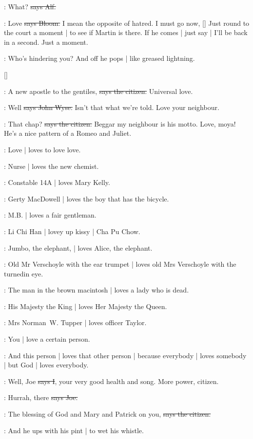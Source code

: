 \bergan:
What?
\sout{says Alf.}

\Bloom:
Love
\sout{says Bloom.}
I mean the opposite of hatred.
I must go now,
[]
Just round to the court a moment |
to see if Martin is there.
If he comes |
just say |
I'll be back in a second.
Just a moment.

\Nq:
Who's hindering you?
And off he pops |
like greased lightning.

[]

\citizen:
A new apostle to the gentiles,
\sout{says the citizen.}
Universal love.

\johnwyse:
Well
\sout{says John Wyse.}
Isn't that what we're told.
Love your neighbour.

\citizen:
That chap?
\sout{says the citizen.}
Beggar my neighbour is his motto.
Love,
moya!
He's a nice pattern of a Romeo and Juliet.

:
Love |
loves to love love.

:
Nurse |
loves the new chemist.

:
Constable 14A |
loves Mary Kelly.

:
Gerty MacDowell |
loves the boy that has the bicycle.

:
M.B. |
loves a fair gentleman.

:
Li Chi Han |
lovey up kissy |
Cha Pu Chow.

:
Jumbo, the elephant, |
loves Alice, the elephant.

:
Old Mr Verschoyle with the ear trumpet |
loves old Mrs Verschoyle with the turnedin eye.

:
The man in the brown macintosh |
loves a lady who is dead.

:
His Majesty the King |
loves Her Majesty the Queen.

:
Mrs Norman~W. Tupper |
loves officer Taylor.

:
You |
love a certain person.

:
And this person |
loves that other person |
because everybody |
loves somebody |
but God |
loves everybody.

:
Well,
Joe
\sout{says I},
your very good health and song.
More power,
citizen.

\joe:
Hurrah,
there
\sout{says Joe.}

\citizen:
The blessing of God and Mary and Patrick on you,
\sout{says the citizen.}

\Nq:
And he ups with his pint |
to wet his whistle.

